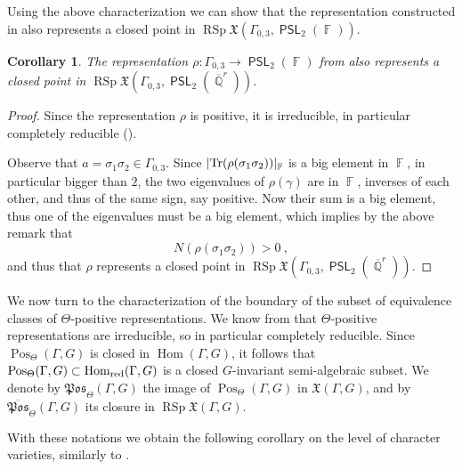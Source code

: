 \documentclass{amsart}
\theoremstyle{plain}
\newtheorem{corollary}[proposition]{Corollary}
\theoremstyle{definition}
\DeclareMathOperator{\PSL}{\mathsf{PSL}}
\DeclareMathOperator{\Hom}{Hom}
\DeclareMathOperator{\rsp}{RSp}
\DeclareMathOperator{\Pos}{Pos}
\DeclareMathOperator{\Fb}{{\mathbb{F}}}
\DeclareMathOperator{\Qb}{\mathbb{Q}}
\newcommand{\Tr}{\textnormal{Tr}}
\newcommand{\red}{\textnormal{red}}
\newcommand{\1}{\mathbf{1}}
\begin{document}
Using the above characterization we can show that the representation constructed in  also represents a closed point in $\rsp\mathfrak{X}(\Gamma_{0,3},\PSL_2(\Fb))$.

\begin{corollary}
    The representation $\rho \colon \Gamma_{0,3} \to \PSL_2(\Fb)$ from  also represents a closed point in $\rsp\mathfrak{X}(\Gamma_{0,3},\PSL_2(\overline{\Qb}^r))$.
\end{corollary}
\begin{proof}
    Since the representation $\rho$ is positive, it is irreducible, in particular completely reducible ().

    Observe that $a=\sigma_1\sigma_2 \in \Gamma_{0,3}$.
    Since $\vert \Tr(\rho(\sigma_1\sigma_2))\vert_{\Fb}$ is a big element in $\Fb$, in particular bigger than $2$, the two eigenvalues of $\rho(\gamma)$ are in $\Fb$, inverses of each other, and thus of the same sign, say positive.
    Now their sum is a big element, thus one of the eigenvalues must be a big element, which implies by the above remark that 
    \[N(\rho(\sigma_1\sigma_2)) >0~,\]
    and thus that $\rho$ represents a closed point in $\rsp\mathfrak{X}(\Gamma_{0,3},\PSL_2(\overline{\Qb}^r))$.
\end{proof}

We now turn to the characterization of the boundary of the subset of equivalence classes of $\Theta$-positive representations.
We know from  that $\Theta$-positive representations are irreducible, so in particular completely reducible.
Since $\Pos_\Theta(\Gamma,G)$ is closed in $\Hom(\Gamma,G)$, it follows that $\Pos_\Theta(\Gamma,G) \subset \Hom_\red(\Gamma,G)$ is a closed $G$-invariant semi-algebraic subset.
We denote by $\mathfrak{Pos}_\Theta(\Gamma,G)$ the image of $\Pos_\Theta(\Gamma,G)$ in $\mathfrak{X}(\Gamma,G)$, and by $\overline{\mathfrak{Pos}}_\Theta(\Gamma,G)$ its closure in $\rsp\mathfrak{X}(\Gamma,G)$. 
    
With these notations we obtain the following corollary on the level of character varieties, similarly to .
\end{document}

